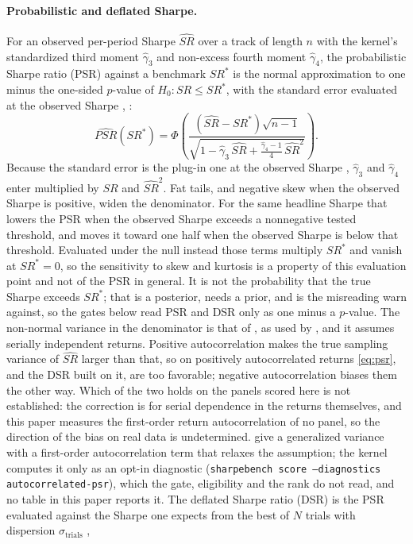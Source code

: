 \paragraph{Probabilistic and deflated Sharpe.} For an observed per-period Sharpe $\widehat{SR}$ over a track of length $n$ with the kernel's standardized third moment $\hat{\gamma}_3$ and non-excess fourth moment $\hat{\gamma}_4$, the probabilistic Sharpe ratio (PSR) against a benchmark $SR^{*}$ is the normal approximation to one minus the one-sided $p$-value of $H_0\colon SR\le SR^{*}$, with the standard error evaluated at the observed Sharpe \citep{bailey2012sharpe}, \citep[eqs.~3 and 9]{lopezdeprado2026howto}:
\begin{equation}\label{eq:psr}
\widehat{PSR}(SR^{*}) = \Phi\left(\frac{(\widehat{SR}-SR^{*})\sqrt{n-1}}{\sqrt{1-\hat{\gamma}_3\,\widehat{SR}+\frac{\hat{\gamma}_4-1}{4}\,\widehat{SR}^{2}}}\right).
\end{equation}
Because the standard error is the plug-in one at the observed Sharpe \citep[eq.~3]{lopezdeprado2026howto}, $\hat{\gamma}_3$ and $\hat{\gamma}_4$ enter multiplied by $\widehat{SR}$ and $\widehat{SR}^2$. Fat tails, and negative skew when the observed Sharpe is positive, widen the denominator. For the same headline Sharpe that lowers the PSR when the observed Sharpe exceeds a nonnegative tested threshold, and moves it toward one half when the observed Sharpe is below that threshold. Evaluated under the null instead \citep[eq.~5]{lopezdeprado2026howto} those terms multiply $SR^{*}$ and vanish at $SR^{*}=0$, so the sensitivity to skew and kurtosis is a property of this evaluation point and not of the PSR in general. It is not the probability that the true Sharpe exceeds $SR^{*}$; that is a posterior, needs a prior, and is the misreading \citet[pp.~3 and 6]{lopezdeprado2026howto} warn against, so the gates below read PSR and DSR only as one minus a $p$-value. The non-normal variance in the denominator is that of \citet{mertens2002comments}, as used by \citet{bailey2012sharpe}, and it assumes serially independent returns. Positive autocorrelation makes the true sampling variance of $\widehat{SR}$ larger than that, so on positively autocorrelated returns \cref{eq:psr}, and the DSR built on it, are too favorable; negative autocorrelation biases them the other way. Which of the two holds on the panels scored here is not established: the correction is for serial dependence in the returns themselves, and this paper measures the first-order return autocorrelation of no panel, so the direction of the bias on real data is undetermined.  give a generalized variance with a first-order autocorrelation term that relaxes the assumption; the kernel computes it only as an opt-in diagnostic (\texttt{sharpebench score --diagnostics autocorrelated-psr}), which the gate, eligibility and the rank do not read, and no table in this paper reports it. The deflated Sharpe ratio (DSR) is the PSR evaluated against the Sharpe one expects from the best of $N$ trials with dispersion $\sigma_{\text{trials}}$ \citep{bailey2014deflated},
